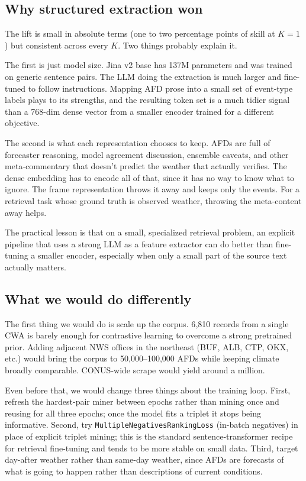 \documentclass[11pt]{article}
\begin{document}
\subsection{Why structured extraction won}
The lift is small in absolute terms (one to two percentage points of skill at \(K{=}1\)) but consistent across every \(K\). Two things probably explain it.

The first is just model size. Jina v2 base has 137M parameters and was trained on generic sentence pairs. The LLM doing the extraction is much larger and fine-tuned to follow instructions. Mapping AFD prose into a small set of event-type labels plays to its strengths, and the resulting token set is a much tidier signal than a 768-dim dense vector from a smaller encoder trained for a different objective.

The second is what each representation chooses to keep. AFDs are full of forecaster reasoning, model agreement discussion, ensemble caveats, and other meta-commentary that doesn't predict the weather that actually verifies. The dense embedding has to encode all of that, since it has no way to know what to ignore. The frame representation throws it away and keeps only the events. For a retrieval task whose ground truth is observed weather, throwing the meta-content away helps.

The practical lesson is that on a small, specialized retrieval problem, an explicit pipeline that uses a strong LLM as a feature extractor can do better than fine-tuning a smaller encoder, especially when only a small part of the source text actually matters.

\subsection{What we would do differently}
The first thing we would do is scale up the corpus. 6{,}810 records from a single CWA is barely enough for contrastive learning to overcome a strong pretrained prior. Adding adjacent NWS offices in the northeast (BUF, ALB, CTP, OKX, etc.) would bring the corpus to 50{,}000--100{,}000 AFDs while keeping climate broadly comparable. CONUS-wide scrape would yield around a million.

Even before that, we would change three things about the training loop. First, refresh the hardest-pair miner between epochs rather than mining once and reusing for all three epochs; once the model fits a triplet it stops being informative. Second, try \texttt{MultipleNegativesRankingLoss} (in-batch negatives) in place of explicit triplet mining; this is the standard sentence-transformer recipe for retrieval fine-tuning and tends to be more stable on small data. Third, target day-after weather rather than same-day weather, since AFDs are forecasts of what is going to happen rather than descriptions of current conditions.
\end{document}
